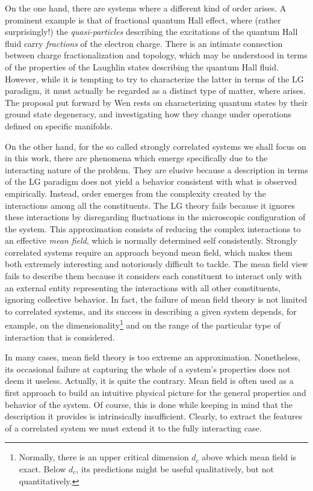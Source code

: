 On the one hand, there are systems where a different kind of order arises.
A prominent example is that of fractional quantum Hall effect, where (rather surprisingly!) the \emph{quasi-particles} describing the excitations of the quantum Hall fluid carry \emph{fractions} of the electron charge.
There is an intimate connection between charge fractionalization and topology, which may be understood in terms of the properties of the Laughlin states describing the quantum Hall fluid. However, while it is tempting to try to characterize the latter in terms of the \acs{LG} paradigm, it must actually be regarded as a distinct type of matter, where  arises.
The proposal put forward by Wen \cite{wen_topological_1990} rests on characterizing quantum states by their ground state degeneracy, and investigating how they change under operations defined on specific manifolds. 

On the other hand, for the so called strongly correlated systems we shall focus on in this work, there are phenomena which emerge specifically due to the interacting nature of the problem.
They are elusive because a description in terms of the \acs{LG} paradigm does not yield a behavior consistent with what is observed empirically.
Instead, order emerges from the complexity created by the interactions among all the constituents.
The \acs{LG} theory fails because it ignores these interactions by disregarding fluctuations in the microscopic configuration of the system.
This approximation consists of reducing the complex interactions to an effective \emph{mean field}, which is normally determined self consistently.
Strongly correlated systems require an approach beyond mean field, which makes them both extremely interesting and notoriously difficult to tackle.
The mean field view fails to describe them because it considers each constituent to interact only with an external entity representing the interactions with all other constituents, ignoring collective behavior.
In fact, the failure of mean field theory is not limited to correlated systems, and its success in describing a given system depends, for example, on the dimensionality\footnote{Normally, there is an upper critical dimension $d_c$ above which mean field is exact. Below $d_c$, its predictions might be useful qualitatively, but not quantitatively.} and on the range of the particular type of interaction that is considered.

In many cases, mean field theory is too extreme an approximation.
Nonetheless, its occasional failure at capturing the whole of a system's properties does not deem it  useless.
Actually, it is quite the contrary.
Mean field is often used as a first approach to build an intuitive physical picture for the general properties and behavior of the system.
Of course, this is done while keeping in mind that the description it provides is intrinsically insufficient.
Clearly, to extract the features of a correlated system we must extend it to the fully interacting case.

